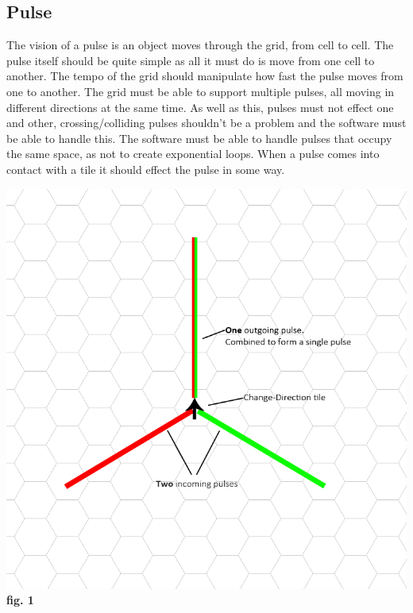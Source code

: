 \documentclass[10pt,a4paper]{article}
\begin{document}
\subsection{Pulse}
The vision of a pulse is an object moves through the grid, from cell to cell. The pulse itself should be quite simple as all it must do is move from one cell to another. The tempo of the grid should manipulate how fast the pulse moves from one to another. The grid must be able to support multiple pulses, all moving in different directions at the same time. As well as this, pulses must not effect one and other, crossing/colliding pulses shouldn't be a problem and the software must be able to handle this. The software must be able to handle pulses that occupy the same space, as not to create exponential loops. When a pulse comes into contact with a tile it should effect the pulse in some way.
\begin{center}
\includegraphics[scale=0.4]{6.png}\\
\textbf{fig. 1}
\end{center}
\end{document}
